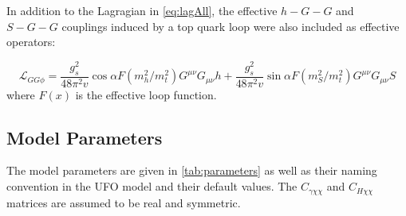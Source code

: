\documentclass[a4paper,11pt]{article}
\begin{document}
In addition to the Lagragian in \cref{eq:lagAll}, the effective $h-G-G$ and $S-G-G$ couplings induced by a top quark loop were also included as effective operators:

\begin{equation*}
	\mathcal{L}_{GG\phi} =  \frac{g_s^2}{48 \pi^2 v} \cos\alpha F(m_h^2/m_t^2) G^{\mu\nu} G_{\mu\nu} h + \frac{g_s^2}{48 \pi^2 v} \sin\alpha F(m_S^2/m_t^2) G^{\mu\nu} G_{\mu\nu} S
\end{equation*}
where $F(x)$ is the effective loop function.
\subsection*{Model Parameters}

The model parameters are given in \cref{tab:parameters} as well as their naming convention in the UFO model and their default values. The $C_{\gamma \chi\chi}$ and $C_{H \chi\chi}$ matrices are assumed to be real and symmetric.
\end{document}
